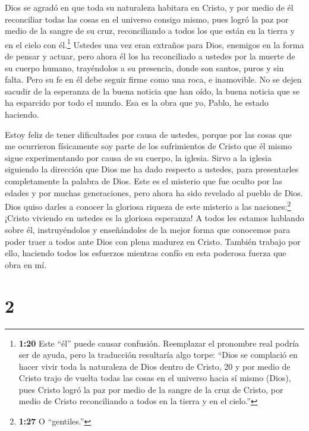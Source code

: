  Dios se agradó en que toda su naturaleza habitara en
Cristo,  y por medio de él reconciliar todas las cosas en
el universo consigo mismo, pues logró la paz por medio de la sangre de
su cruz, reconciliando a todos los que están en la tierra y en el cielo
con él.\footnote{\textbf{1:20} Este ``él'' puede causar confusión.
  Reemplazar el pronombre real podría ser de ayuda, pero la traducción
  resultaría algo torpe: ``Dios se complació en hacer vivir toda la
  naturaleza de Dios dentro de Cristo, 20 y por medio de Cristo trajo de
  vuelta todas las cosas en el universo hacia sí mismo (Dios), pues
  Cristo logró la paz por medio de la sangre de la cruz de Cristo, por
  medio de Cristo reconciliando a todos en la tierra y en el cielo.''}
 Ustedes una vez eran extraños para Dios, enemigos en la
forma de pensar y actuar,  pero ahora él los ha
reconciliado a ustedes por la muerte de su cuerpo humano, trayéndolos a
su presencia, donde son santos, puros y sin falta.  Pero su
fe en él debe seguir firme como una roca, e inamovible. No se dejen
sacudir de la esperanza de la buena noticia que han oído, la buena
noticia que se ha esparcido por todo el mundo. Esa es la obra que yo,
Pablo, he estado haciendo.

 Estoy feliz de tener dificultades por causa de ustedes,
porque por las cosas que me ocurrieron físicamente soy parte de los
sufrimientos de Cristo que él mismo sigue experimentando por causa de su
cuerpo, la iglesia.  Sirvo a la iglesia siguiendo la
dirección que Dios me ha dado respecto a ustedes, para presentarles
completamente la palabra de Dios.  Este es el misterio que
fue oculto por las edades y por muchas generaciones, pero ahora ha sido
revelado al pueblo de Dios.  Dios quiso darles a conocer la
gloriosa riqueza de este misterio a las naciones:\footnote{\textbf{1:27}
  O ``gentiles.''} ¡Cristo viviendo en ustedes es la gloriosa esperanza!
 A todos les estamos hablando sobre él, instruyéndolos y
enseñándoles de la mejor forma que conocemos para poder traer a todos
ante Dios con plena madurez en Cristo.  También trabajo por
ello, haciendo todos los esfuerzos mientras confío en esta poderosa
fuerza que obra en mí.

\hypertarget{section-1}{%
\section{2}\label{section-1}}

